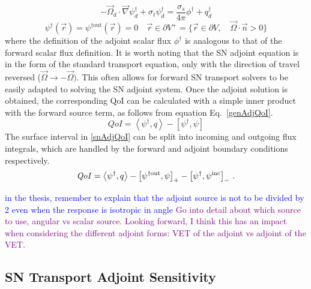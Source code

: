 \documentclass[12pt]{report}
\newcommand{\vr}{\vec{r}}
\newcommand{\vO}{\vec{\Omega}}
\newcommand{\bra}{\left\langle}
\newcommand{\ket}{\right\rangle}
\newcommand{\sbra}{\left[}
\newcommand{\sket}{\right]}
\newcommand{\grad}{\vec{\nabla}}
\newcommand{\bound}{\partial V}
\newcommand{\sigt}{\sigma_t}
\newcommand{\sigs}{\sigma_s}
\newcommand{\angSource}{q}
\newcommand{\angResp}{q^\dag}
\newcommand{\qoi}{{\it QoI}\xspace}
\newcommand{\comment}[2]{\marginpar{\textcolor{#2}{$\star$}}\textcolor{#2}{#1}\newline}
\newcommand{\jcr}[1]{\comment{#1}{blue}}
\newcommand{\todo}[1]{\comment{#1}{purple}}
\newcommand{\jcr}[1]{\phantom{a}}
\newcommand{\todo}[1]{\phantom{a}}
\begin{document}
\begin{equation}
- \vO_d \cdot \grad \psi^\dag_d + \sigt \psi^\dag_d = \frac{\sigs}{4 \pi} \phi^\dag + \angResp_d
\end{equation}
%
\begin{equation}
\psi^\dag(\vr) = \psi^{\dag \text{out}}(\vr)=0 \quad \vr \in \partial V^{+} = \{  \vr \in \bound , \quad \vO \cdot \vec{n} > 0 \}
\end{equation}
where the definition of the adjoint scalar flux $\phi^\dag$ is analogous to that of 
the forward scalar flux definition. It is worth noting that the SN adjoint equation is in the form of the standard transport equation, only with the direction of travel reversed ($\vO \to -\vO)$. This often allows for forward SN transport solvers to be easily adapted to solving the SN adjoint system. Once the adjoint solution is obtained, the corresponding QoI can be calculated with a simple inner product with the forward source term, as follows from equation Eq.~\eqref{genAdjQoI}. %
\begin{equation}
\label{snAdjQoI}
QoI = \bra \psi^\dag , \angSource \ket - \sbra \psi^\dag,  \psi \sket
\end{equation}
%
The surface interval in \eqref{snAdjQoI} can be split into incoming and outgoing flux integrals, which are handled by the forward and adjoint boundary conditions respectively. 
%
\begin{equation}
\label{snAdjQoIBCsplit}
\qoi = \bra \psi^\dag , q \ket - \sbra \psi^{\dag \text{out}},  \psi \sket_+ - \sbra \psi^\dag,  \psi^{\text{inc}} \sket_- \,.
\end{equation}

\jcr{in the thesis, remember to explain that the adjoint source is not to be divided by 2 even when the response is isotropic in angle}
\todo{Go into detail about which source to use, angular vs scalar source. Looking forward, I think this has an impact when considering the different adjoint forms: VET of the adjoint vs adjoint of the VET.}
\subsection{SN Transport Adjoint Sensitivity}
\end{document}
